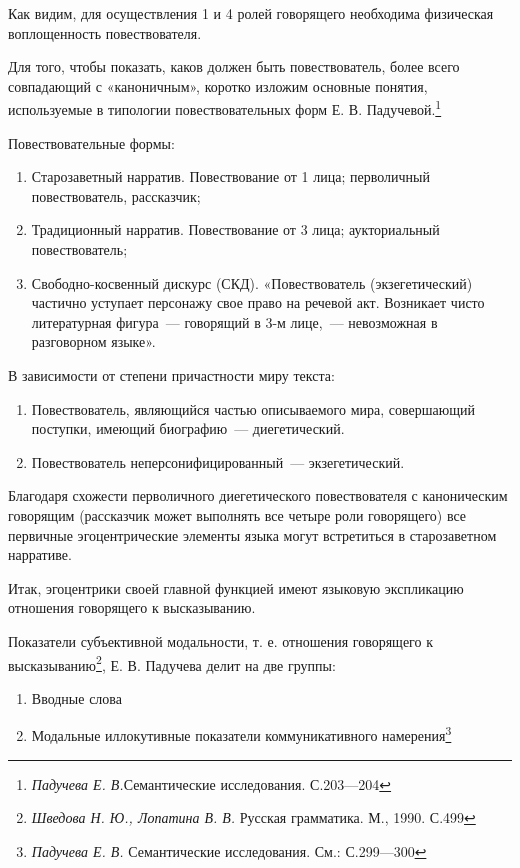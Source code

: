 \documentclass{kursa4}
\begin{document}
      \bigskip

      Как видим, для осуществления 1 и 4 ролей говорящего необходима физическая воплощенность повествователя. 

      Для того, чтобы показать, каков должен быть повествователь, более всего совпадающий с «каноничным», коротко изложим основные понятия, используемые в типологии повествовательных форм Е. В. Падучевой.\footnote{\textit{Падучева Е. В.}Семантические исследования. С.203—204} \newline

      Повествовательные формы:
      \begin{enumerate}
        \item Старозаветный нарратив. Повествование от 1 лица; перволичный повествователь, рассказчик; 
        \item Традиционный нарратив. Повествование от 3 лица; аукториальный повествователь; \item Свободно-косвенный дискурс (СКД). «Повествователь (экзегетический) частично уступает персонажу свое право на речевой акт. Возникает чисто литературная фигура~--- говорящий в 3-м лице,~--- невозможная в разговорном языке». \end{enumerate}

      В зависимости от степени причастности миру текста: \begin{enumerate}
        \item Повествователь, являющийся частью описываемого мира, совершающий поступки, имеющий биографию~--- диегетический. 
        \item Повествователь неперсонифицированный~--- экзегетический. 
       \end{enumerate} 

      Благодаря схожести перволичного диегетического повествователя с каноническим говорящим (рассказчик может выполнять все четыре роли говорящего) все первичные эгоцентрические элементы языка могут встретиться в старозаветном нарративе. 

      Итак, эгоцентрики своей главной функцией имеют языковую экспликацию отношения говорящего к высказыванию. 

      Показатели субъективной модальности, т. е. отношения говорящего к высказыванию\footnote{\textit{ Шведова Н. Ю., Лопатина В. В.} Русская грамматика. М., 1990. С.499}, Е. В. Падучева делит на две группы: 

      \begin{enumerate}
        \item Вводные слова \item Модальные иллокутивные показатели коммуникативного намерения\footnote{\textit{Падучева Е. В.} Семантические исследования. См.: С.299—300}        
      \end{enumerate}
\end{document}
